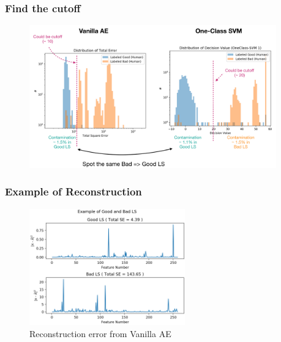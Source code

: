 \documentclass{beamer}
\begin{document}

\begin{frame}
\frametitle{Find the cutoff}
\begin{figure}
    \includegraphics[height=0.8\textheight, width=0.95\textwidth]{images/decision_value_dist}
\end{figure}
\end{frame}

\begin{frame}
\frametitle{Example of Reconstruction}
\begin{figure}
    \includegraphics[height=0.7\textheight, width=0.6\textwidth]{images/example_se}
    \caption{Reconstruction error from Vanilla AE}
\end{figure}
\end{frame}
\end{document}
